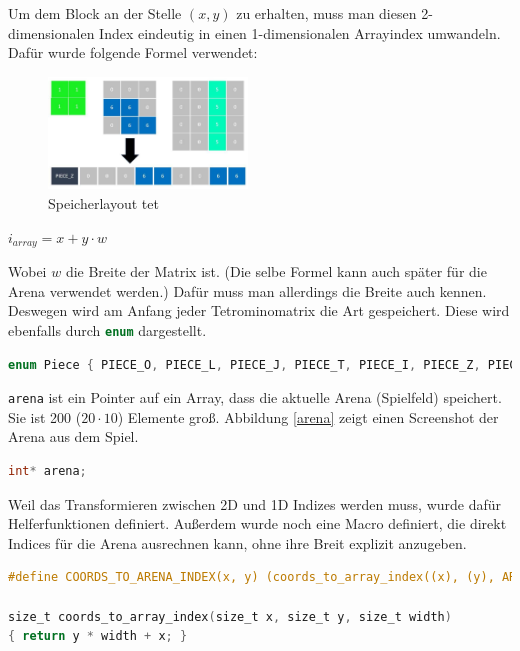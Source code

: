 \documentclass[11pt]{article}
\newcommand{\lstin}[1]{\lstinline[language=C]{#1}}
\begin{document}
Um dem Block an der Stelle $(x, y)$ zu erhalten, muss man diesen 2-dimensionalen Index eindeutig in einen 1-dimensionalen Arrayindex umwandeln. Dafür wurde folgende Formel verwendet:

\begin{figure}[h]
  \centering
  \includegraphics[width=200px]{../images/mem_layout.jpg}
  \caption{Speicherlayout \gls{tet}}
\end{figure}

\begin{center}
  \begin{math}
    i_{array} = x + y \cdot w
  \end{math}
\end{center}

Wobei $w$ die Breite der Matrix ist. (Die selbe Formel kann auch später für die Arena verwendet werden.)
Dafür muss man allerdings die Breite auch kennen. Deswegen wird am Anfang jeder Tetrominomatrix die Art gespeichert. Diese wird ebenfalls durch \lstin{enum} dargestellt.

\begin{lstlisting}[language=C]
enum Piece { PIECE_O, PIECE_L, PIECE_J, PIECE_T, PIECE_I, PIECE_Z, PIECE_S };
\end{lstlisting}

\lstin{arena} ist ein Pointer auf ein Array, dass die aktuelle Arena (Spielfeld) speichert. Sie ist 200 ($20 \cdot 10$) Elemente groß.
Abbildung \ref{arena} zeigt einen Screenshot der Arena aus dem Spiel.
\begin{lstlisting}[language=C]
int* arena;  
\end{lstlisting}

Weil das Transformieren zwischen 2D und 1D Indizes werden muss, wurde dafür Helferfunktionen definiert. Außerdem wurde noch eine Macro definiert, die direkt Indices für die Arena ausrechnen kann, ohne ihre Breit explizit anzugeben.

\begin{lstlisting}[language=C]
#define COORDS_TO_ARENA_INDEX(x, y) (coords_to_array_index((x), (y), ARENA_WIDTH))

size_t coords_to_array_index(size_t x, size_t y, size_t width)
{ return y * width + x; }
\end{lstlisting}
\end{document}

